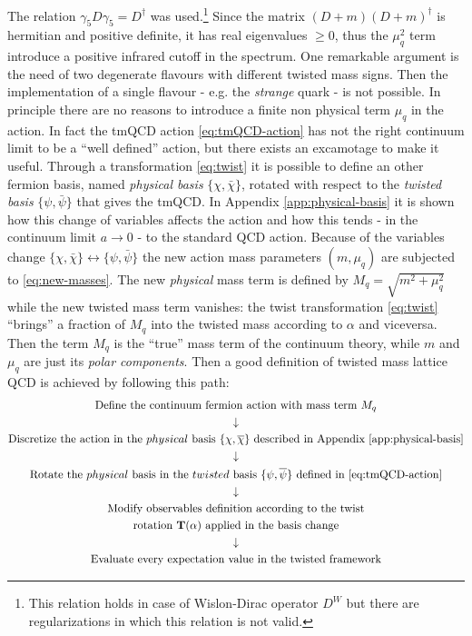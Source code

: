 \documentclass[english, LaM, oneside, noexaminfo]{sapthesis}
\begin{document}
The relation $\gamma_5 D \gamma_5 = D^\dagger$ was used.\footnote{This relation holds in case of Wislon-Dirac operator $D^W$ but there are regularizations in which this relation is not valid.}
Since the matrix $(D+m)(D+m)^\dagger$ is hermitian and positive definite, it has real eigenvalues $\ge 0$, thus the $\mu_q^2$ term introduce a positive infrared cutoff in the spectrum.
One remarkable argument is the need of two degenerate flavours with different twisted mass signs.
Then the implementation of a single flavour - e.g. the {\it strange} quark - is not possible.
\newline
In principle there are no reasons to introduce a finite non physical term $\mu_q$ in the action.
In fact the tmQCD action \ref{eq:tmQCD-action} has not the right continuum limit to be a ``well defined'' action, but there exists an excamotage to make it useful.
Through a transformation \ref{eq:twist} it is possible to define an other fermion basis, named \textit{physical basis} $\{\chi, \bar\chi\}$, rotated with respect to the \textit{twisted basis} $\{\psi, \bar\psi\}$ that gives the tmQCD.
In Appendix \ref{app:physical-basis} it is shown how this change of variables affects the action and how this tends - in the continuum limit $a\rightarrow 0$ - to the standard QCD action.
Because of the variables change $\{\chi, \bar\chi\} \leftrightarrow \{\psi, \bar\psi\}$ the new action mass parameters $(m,\mu_q)$ are subjected to \ref{eq:new-masses}.
The new \textit{physical} mass term is defined by $M_q = \sqrt{m^2 + \mu_q ^2}$ while the new twisted mass term vanishes: the twist transformation \ref{eq:twist} ``brings'' a fraction of $M_q$ into the twisted mass according to $\alpha$ and viceversa.
Then the term $M_q$ is the ``true'' mass term of the continuum theory, while $m$ and $\mu_q$ are just its \textit{polar components}.
Then a good definition of twisted mass lattice QCD is achieved by following this path:
\begin{equation*}
    \begin{gathered}
        \text{Define the continuum fermion action with mass term } M_q \\
        \downarrow \\
        \text{Discretize the action in the } physical \text{ basis } \{\chi,\overline{\chi}\} \text{ described in Appendix \ref{app:physical-basis}} \\
        \downarrow  \\
        \text{Rotate the } physical \text{ basis in the } twisted \text{ basis } \{\psi,\overline{\psi}\} \text{ defined in \ref{eq:tmQCD-action}} \\
        \downarrow \\
        \text{Modify observables definition according to the twist}\\
        \text{rotation } \mathbf{T}(\alpha)  \text{ applied in the basis change}\\
        \downarrow \\
        \text{Evaluate every expectation value in the twisted framework}
    \end{gathered}
\end{equation*}
\end{document}
